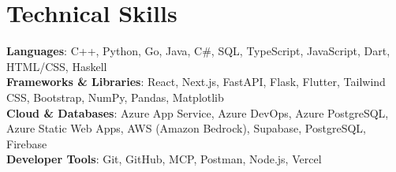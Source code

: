 \documentclass[letterpaper,11pt]{article}
\begin{document}
\section{Technical Skills}
 \begin{itemize}[leftmargin=0.15in, label={}]
    \small{\item{
     \textbf{Languages}{: C++, Python, Go, Java, C\#, SQL, TypeScript, JavaScript, Dart, HTML/CSS, Haskell} \\
     \textbf{Frameworks \& Libraries}{: React, Next.js, FastAPI, Flask, Flutter, Tailwind CSS, Bootstrap, NumPy, Pandas, Matplotlib} \\
  	 \textbf{Cloud \& Databases}{: Azure App Service, Azure DevOps, Azure PostgreSQL, Azure Static Web Apps, AWS (Amazon Bedrock), Supabase, PostgreSQL, Firebase} \\
     \textbf{Developer Tools}{: Git, GitHub, MCP, Postman, Node.js, Vercel} \\
    }}
 \end{itemize}


\end{document}
